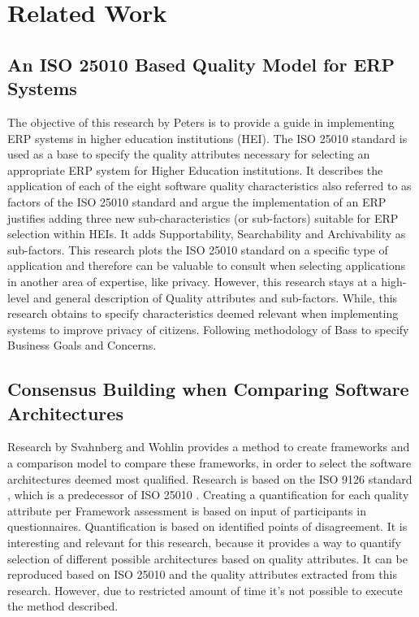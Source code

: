 \chapter{Related Work}\label{s:related}


\section{An ISO 25010 Based Quality Model for ERP Systems}
The objective of this research by Peters \etal \cite{Peters2020AnI2} is to provide a guide in implementing ERP systems in higher education institutions (HEI). The ISO 25010 standard \cite{ISO:25010:2011} is used as a base to specify the quality attributes necessary for selecting an appropriate ERP system for Higher Education institutions. It describes the application of each of the eight software quality characteristics also referred to as factors of the ISO 25010 standard and argue the implementation of an ERP justifies adding three new sub-characteristics (or sub-factors) suitable for ERP selection within HEIs. It adds Supportability, Searchability and Archivability as sub-factors. This research plots the ISO 25010 standard on a specific type of application and therefore can be valuable to consult when selecting applications in another area of expertise, like privacy. However, this research stays at a high-level and general description of Quality attributes and sub-factors. While, this research obtains to specify characteristics deemed relevant when implementing systems to improve privacy of citizens. Following methodology of Bass \etal \cite{Bass2015SoftwareAI} to specify Business Goals and Concerns. 

\section{Consensus Building when Comparing Software Architectures}
Research by Svahnberg and Wohlin \cite{Svahnberg2002ConsensusBW} provides a method to create frameworks and a comparison model to compare these frameworks, in order to select the software architectures deemed most qualified. Research is based on the ISO 9126 standard \cite{ISO9126}, which is a predecessor of ISO 25010 \cite{ISO:25010:2011}. Creating a quantification for each quality attribute per Framework assessment is based on input of participants in questionnaires. Quantification is based on identified points of disagreement. It is interesting and relevant for this research, because it provides a way to quantify selection of different possible architectures based on quality attributes. It can be reproduced based on ISO 25010 and the quality attributes extracted from this research. However, due to restricted amount of time it's not possible to execute the method described.

